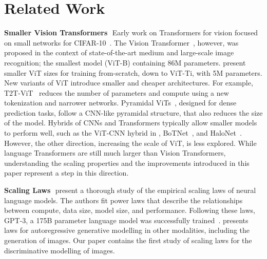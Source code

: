 \section{Related Work}\label{sec:relwork}

\textbf{Smaller Vision Transformers\,\,}
Early work on Transformers for vision focused on  small networks for CIFAR-10~\cite{cordonnier2020}.
The Vision Transformer~\cite{dosovitskiy2020}, however, was proposed in the context of state-of-the-art medium and large-scale image recognition; the smallest model (ViT-B) containing 86M parameters.
\cite{touvron2020training} present smaller ViT sizes for training from-scratch, down to ViT-Ti, with 5M parameters.
New variants of ViT introduce smaller and cheaper architectures.
For example, T2T-ViT~\cite{yuan2021tokens} reduces the number of parameters and compute using a new tokenization and narrower networks.
Pyramidal ViTs~\cite{wang2021pyramid}, designed for dense prediction tasks, follow a CNN-like pyramidal structure, that also reduces the size of the model.
Hybrids of CNNs and Transformers typically allow smaller models to perform well, such as the ViT-CNN hybrid in \cite{dosovitskiy2020}, BoTNet~\cite{srinivas2021bottleneck}, and HaloNet~\cite{vaswani2021scaling}.
However, the other direction, increasing the scale of ViT, is less explored.
While language Transformers are still much larger than Vision Transformers, understanding the scaling properties and the improvements introduced in this paper represent a step in this direction.

\textbf{Scaling Laws\,\,}
\cite{kaplan2020scaling} present a thorough study of the empirical scaling laws of neural language models.
The authors fit power laws that describe the relationships between compute, data size, model size, and performance. 
Following these laws, GPT-3, a 175B parameter language model was successfully trained~\cite{brown2020language}.
\cite{henighan2020scaling} presents laws for autoregressive generative modelling in other modalities, including the generation of images.
Our paper contains the first study of scaling laws for the discriminative modelling of images.

